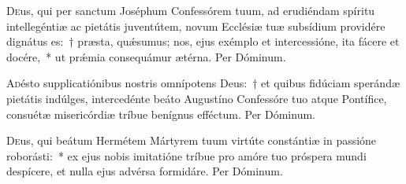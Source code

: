 \documentclass[vesperale_romanum.tex]{subfiles}
\begin{document}
\oratio

\lettrine{D}{e}us, qui per san\-ctum Joséphum Confessórem tuum, ad erudiéndam spíritu intellegéntiæ ac pietátis juventútem, novum Ecclésiæ tuæ subsídium providére dignátus es:~† præsta, quǽsumus; nos, ejus exémplo et intercessióne, ita fácere et docére,~* ut prǽmia consequámur ætérna.
Per Dóminum.


\myrule


\duplex


\oratio

\lettrine{A}{d}ésto supplicatiónibus nostris omnípotens Deus:~† et quibus fidúciam sperándæ pietátis indúlges, intercedénte beáto Augustíno Confessóre tuo atque Pontífice, consuétæ misericórdiæ tríbue benígnus effé\-ctum. Per Dóminum.



\oratio

\lettrine{D}{e}us, qui beátum Hermétem Mártyrem tuum virtúte constántiæ in passióne roborásti:~* ex ejus nobis imitatióne tríbue pro amóre tuo próspera mundi despícere, et nulla ejus advérsa formidáre.
Per Dóminum.


\myrule


\duplexmajus






\end{document}
